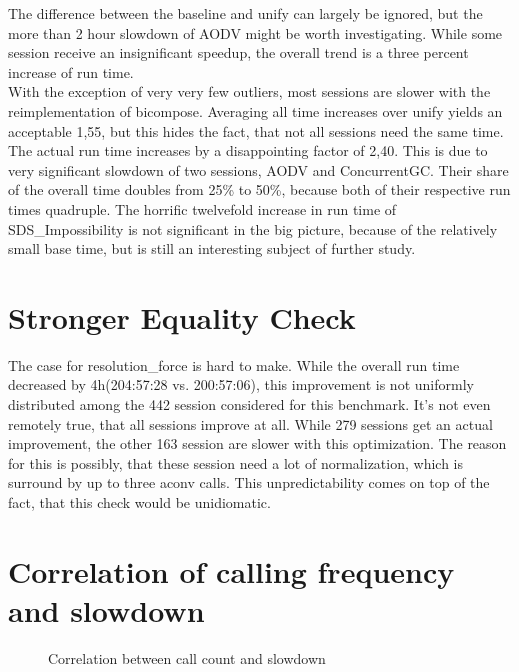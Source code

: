 The difference between the baseline and unify can largely be ignored, but the more than 2 hour slowdown of AODV might be worth investigating. While some session receive an insignificant speedup, the overall trend is a three percent increase of run time.\\
With the exception of very very few outliers, most sessions are slower with the reimplementation of bicompose. Averaging all time increases over unify yields an acceptable 1,55, but this hides the fact, that not all sessions need the same time. The actual run time increases by a disappointing factor of 2,40. This is due to very significant slowdown of two sessions, AODV and ConcurrentGC. Their share of the overall time doubles from 25\% to 50\%, because both of their respective run times quadruple. The horrific twelvefold increase in run time of SDS\_Impossibility is not significant in the big picture, because of the relatively small base time, but is still an interesting subject of further study.

\section{Stronger Equality Check}

The case for resolution\_force is hard to make. While the overall run time decreased by 4h(204:57:28 vs. 200:57:06), this improvement is not uniformly distributed among the 442 session considered for this benchmark. It's not even remotely true, that all sessions improve at all. While 279 sessions get an actual improvement, the other 163 session are slower with this optimization. The reason for this is possibly, that these session need a lot of normalization, which is surround by up to three aconv calls. This unpredictability comes on top of the fact, that this check would be unidiomatic.

\section{Correlation of calling frequency and slowdown}

\begin{figure}[ht]
\centering
\caption{Correlation between call count and slowdown}
\label{fig:correlation}
\end{figure}